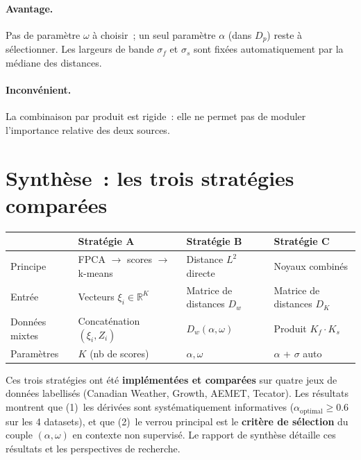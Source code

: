 \documentclass[11pt, a4paper]{article}
\newcommand{\R}{\mathbb{R}}
\begin{document}
\paragraph{Avantage.} Pas de param\`etre $\omega$ \`a choisir~; un seul param\`etre $\alpha$ (dans $D_p$) reste \`a s\'electionner. Les largeurs de bande $\sigma_f$ et $\sigma_s$ sont fix\'ees automatiquement par la m\'ediane des distances.

\paragraph{Inconv\'enient.} La combinaison par produit est rigide~: elle ne permet pas de moduler l'importance relative des deux sources.

\section{Synth\`ese~: les trois strat\'egies compar\'ees}

\begin{center}
\begin{tabular}{llll}
    \hline
    & \textbf{Strat\'egie A} & \textbf{Strat\'egie B} & \textbf{Strat\'egie C} \\
    \hline
    Principe & FPCA $\to$ scores $\to$ k-means & Distance $L^2$ directe & Noyaux combin\'es \\
    Entr\'ee & Vecteurs $\xi_i \in \R^K$ & Matrice de distances $D_w$ & Matrice de distances $D_K$ \\
    Donn\'ees mixtes & Concat\'enation $(\xi_i, Z_i)$ & $D_w(\alpha, \omega)$ & Produit $K_f \cdot K_s$ \\
    Param\`etres & $K$ (nb de scores) & $\alpha, \omega$ & $\alpha$ + $\sigma$ auto \\
    \hline
\end{tabular}
\end{center}

\medskip
Ces trois strat\'egies ont \'et\'e \textbf{impl\'ement\'ees et compar\'ees} sur quatre jeux de donn\'ees labellis\'es (Canadian Weather, Growth, AEMET, Tecator). Les r\'esultats montrent que (1)~les d\'eriv\'ees sont syst\'ematiquement informatives ($\alpha_{\text{optimal}} \geq 0.6$ sur les 4 datasets), et que (2)~le verrou principal est le \textbf{crit\`ere de s\'election} du couple $(\alpha, \omega)$ en contexte non supervis\'e. Le rapport de synth\`ese d\'etaille ces r\'esultats et les perspectives de recherche.
\end{document}

